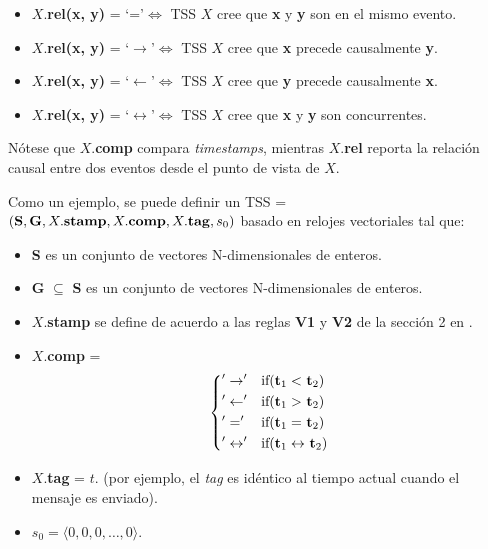\documentclass[12pt, times]{simauth}
\begin{document}
\begin{itemize}
    \item[] $X.$\textbf{rel(x, y)} = \textquoteleft=\textquoteright $\Leftrightarrow$ TSS $X$ cree que \textbf{x} y \textbf{y} son en el mismo evento.
    \item[] $X.$\textbf{rel(x, y)} = \textquoteleft$\to$\textquoteright $\Leftrightarrow$ TSS $X$ cree que \textbf{x} precede causalmente \textbf{y}.
    \item[] $X.$\textbf{rel(x, y)} = \textquoteleft$\leftarrow$\textquoteright $\Leftrightarrow$ TSS $X$ cree que \textbf{y} precede causalmente \textbf{x}.
    \item[] $X.$\textbf{rel(x, y)} = \textquoteleft$\leftrightarrow$\textquoteright $\Leftrightarrow$ TSS $X$ cree que \textbf{x} y \textbf{y} son concurrentes.            
\end{itemize}

Nótese que $X$.\textbf{comp} compara \emph{timestamps}, mientras $X$.\textbf{rel} reporta la relación causal entre dos eventos desde el punto de vista de $X$. 

Como un ejemplo, se puede definir un TSS = $(\text{\textbf{S}}, \text{\textbf{G}}, X.\text{\textbf{stamp}}, X.\text{\textbf{comp}}, X.\text{\textbf{tag}}, s_0)$  basado en relojes vectoriales tal que:
\begin{itemize}
    \item[]\textbf{S} es un conjunto de vectores N-dimensionales de enteros.
    \item[]\textbf{G} $\subseteq$ \textbf{S} es un conjunto de vectores N-dimensionales de enteros.
    \item[] $X$.\textbf{stamp} se define de acuerdo a las reglas \textbf{V1} y \textbf{V2} de la sección 2 en \cite{torres}.
    \item[] $X$.\textbf{comp} = \[
    \begin{dcases*}
         '\to'        &  if(\textbf{t}$_1 <$ \textbf{t}$_2$)\\
        '\leftarrow'        &  if(\textbf{t}$_1 >$ \textbf{t}$_2$)\\
        '='        &  if(\textbf{t}$_1 = $ \textbf{t}$_2$)\\
        '\leftrightarrow'        &  if(\textbf{t}$_1 \leftrightarrow$ \textbf{t}$_2$)             
    \end{dcases*}
\] 
    \item[] $X$.\textbf{tag} = $t$. (por ejemplo, el \emph{tag} es idéntico al tiempo actual cuando el mensaje es enviado).
    \item[] $s_0 = \langle0,0,0, \dots, 0\rangle$.     
\end{itemize}
\end{document}
